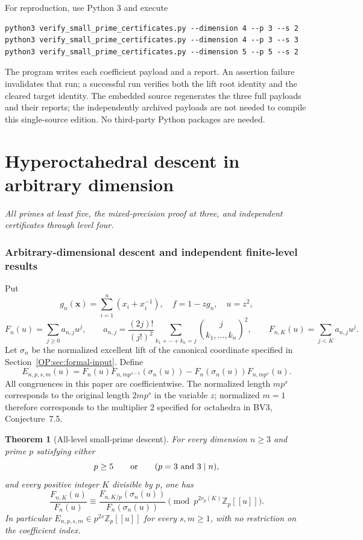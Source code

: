 \documentclass[11pt,a4paper]{article}
\newtheorem{theorem}{Theorem}[section]
\theoremstyle{definition}\newtheorem{definition}[theorem]{Definition}
\theoremstyle{remark}\newtheorem{remark}[theorem]{Remark}
\numberwithin{equation}{section}
\newcommand{\partstart}[3]{\clearpage\part{#1}\label{#2}\noindent\textit{#3}\par\medskip}
\begin{document}
For reproduction, use Python 3 and execute
\begin{verbatim}
python3 verify_small_prime_certificates.py --dimension 4 --p 3 --s 2
python3 verify_small_prime_certificates.py --dimension 4 --p 3 --s 3
python3 verify_small_prime_certificates.py --dimension 5 --p 5 --s 2
\end{verbatim}
The program writes each coefficient payload and a report. An assertion
failure invalidates that run; a successful run verifies both the lift
root identity and the cleared target identity. The embedded source regenerates the three full payloads and their
reports; the independently archived payloads are not needed to
compile this single-source edition. No third-party Python packages are needed.



\partstart{Hyperoctahedral descent in arbitrary dimension}{part:octa-small}{All primes at least five, the mixed-precision proof at three, and independent certificates through level four.}
\section{Arbitrary-dimensional descent and independent finite-level results}\label{OP:source-main-1}\label{OP:sec:scope}
Put
\[
 g_n(\mathbf x)=\sum_{i=1}^n(x_i+x_i^{-1}),\quad f=1-zg_n,
 \quad u=z^2,
\]
\[
 F_n(u)=\sum_{j\ge0}a_{n,j}u^j,\qquad
 a_{n,j}=\frac{(2j)!}{(j!)^2}
       \sum_{k_1+\cdots+k_n=j}\binom{j}{k_1,\ldots,k_n}^{\!2},
 \qquad F_{n,K}(u)=\sum_{j<K}a_{n,j}u^j.
\]
Let $\sigma_n$ be the normalized excellent lift of the canonical
coordinate specified in Section~\ref{OP:sec:formal-input}. Define
\[
 E_{n,p,s,m}(u)=F_n(u)F_{n,mp^{s-1}}(\sigma_n(u))
             -F_n(\sigma_n(u))F_{n,mp^s}(u).
\]
All congruences in this paper are coefficientwise. The normalized
length $mp^s$ corresponds to the original length $2mp^s$ in the
variable $z$; normalized $m=1$ therefore corresponds to the multiplier
$2$ specified for octahedra in BV3, Conjecture~7.5.

\begin{theorem}[All-level small-prime descent]\label{OP:thm:all-level}
For every dimension $n\ge3$ and prime $p$ satisfying either
\[
 p\ge5\qquad\hbox{or}\qquad(p=3\ \hbox{and}\ 3\mid n),
\]
and every positive integer $K$ divisible by $p$, one has
\[
 \frac{F_{n,K}(u)}{F_n(u)}
 \equiv\frac{F_{n,K/p}(\sigma_n(u))}{F_n(\sigma_n(u))}
       \pmod{p^{2v_p(K)}\mathbb Z_p[[u]]}.
\]
In particular $E_{n,p,s,m}\in p^{2s}\mathbb Z_p[[u]]$ for every
$s,m\ge1$, with no restriction on the coefficient index.
\end{theorem}
\end{document}
